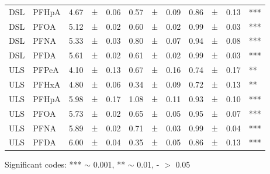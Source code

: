 \begin{table}
{\begin{threeparttable}
\begin{tabular}{llllllllllll}
DSL                                  & PFHpA                     & 4.67        & ±        & 0.06        & 0.57      & ±      & 0.09      & 0.86       & ±       & 0.13               & ***          \\
DSL                                  & PFOA                      & 5.12        & ±        & 0.02        & 0.60      & ±      & 0.02      & 0.99       & ±       & 0.03               & ***          \\
DSL                                  & PFNA                      & 5.33        & ±        & 0.03        & 0.80      & ±      & 0.07      & 0.94       & ±       & 0.08               & ***          \\
DSL                                  & PFDA                      & 5.61        & ±        & 0.02        & 0.61      & ±      & 0.02      & 0.99       & ±       & 0.03               & ***          \\
ULS                                  & PFPeA                     & 4.10        & ±        & 0.13        & 0.67      & ±      & 0.16      & 0.74       & ±       & 0.17               & **           \\
ULS                                  & PFHxA                     & 4.80        & ±        & 0.06        & 0.34      & ±      & 0.09      & 0.72       & ±       & 0.13               & **           \\
ULS                                  & PFHpA                     & 5.98        & ±        & 0.17        & 1.08      & ±      & 0.11      & 0.93       & ±       & 0.10               & ***          \\
ULS                                  & PFOA                      & 5.73        & ±        & 0.02        & 0.65      & ±      & 0.05      & 0.95       & ±       & 0.07               & ***          \\
ULS                                  & PFNA                      & 5.89        & ±        & 0.02        & 0.71      & ±      & 0.03      & 0.99       & ±       & 0.04               & ***          \\
ULS                                  & PFDA                      & 6.00        & ±        & 0.04        & 0.35      & ±      & 0.05      & 0.86       & ±       & 0.13               & ***     \\ \bottomrule    
\end{tabular}
\begin{tablenotes}
\item Significant codes: *** $\sim$ 0.001, ** $\sim$ 0.01, - $>$ 0.05 
\end{tablenotes}
\end{threeparttable}}
\end{table}


